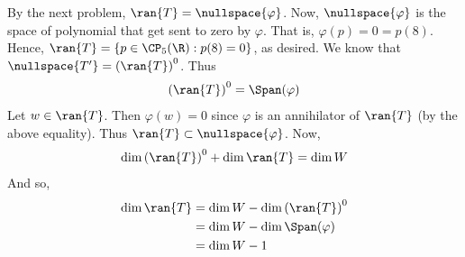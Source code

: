 \documentclass{book}
\begin{document}
\begin{enumerate}[label=\arabic*)]
    \ii
      By the next problem, $\ran{T} = \nullspace{\varphi}$. Now, $\nullspace{\varphi}$ is the space of polynomial that get sent to zero by $\varphi$. That is, $\varphi(p) = 0 = p(8)$. Hence,
      $\ran{T} = \{p \in \CP_5(\R): p(8) = 0\}$, as desired.
    \ii
      We know that $\nullspace{T^{\prime}} = \left( \ran{T} \right)^0$. Thus
      \begin{align*}
        \left( \ran{T} \right)^0 = \Span(\varphi)
      \end{align*}
      Let $w \in \ran{T}$. Then $\varphi(w) = 0$ since $\varphi$ is an annihilator of $\ran{T}$ (by the above equality). Thus $\ran{T} \subset \nullspace{\varphi}$. Now,
      \begin{align*}
        \dim{\left( \ran{T} \right)^0} + \dim{\ran{T}} & = \dim{W} \\
      \end{align*}
      And so,
      \begin{align*}
        \dim{\ran{T}} & = \dim{W} - \dim{\left( \ran{T} \right)^0} \\
        & = \dim{W} - \dim{\Span(\varphi)} \\
        & = \dim{W} - 1 \\

\end{align*}
\end{enumerate}
\end{document}
